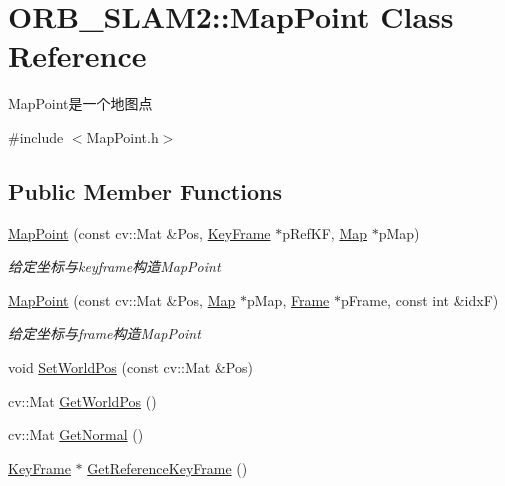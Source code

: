 \hypertarget{class_o_r_b___s_l_a_m2_1_1_map_point}{}\section{O\+R\+B\+\_\+\+S\+L\+A\+M2\+:\+:Map\+Point Class Reference}
\label{class_o_r_b___s_l_a_m2_1_1_map_point}


Map\+Point是一个地图点  




{\ttfamily \#include $<$Map\+Point.\+h$>$}

\subsection*{Public Member Functions}
\begin{DoxyCompactItemize}
\item 
\mbox{\hyperlink{class_o_r_b___s_l_a_m2_1_1_map_point_ae8b6d24a7f79cfd260502859cb5b6901}{Map\+Point}} (const cv\+::\+Mat \&Pos, \mbox{\hyperlink{class_o_r_b___s_l_a_m2_1_1_key_frame}{Key\+Frame}} $\ast$p\+Ref\+KF, \mbox{\hyperlink{class_o_r_b___s_l_a_m2_1_1_map}{Map}} $\ast$p\+Map)
\begin{DoxyCompactList}\small\item\em 给定坐标与keyframe构造\+Map\+Point \end{DoxyCompactList}\item 
\mbox{\hyperlink{class_o_r_b___s_l_a_m2_1_1_map_point_abbb2b679ea956845f315a69773618fa7}{Map\+Point}} (const cv\+::\+Mat \&Pos, \mbox{\hyperlink{class_o_r_b___s_l_a_m2_1_1_map}{Map}} $\ast$p\+Map, \mbox{\hyperlink{class_o_r_b___s_l_a_m2_1_1_frame}{Frame}} $\ast$p\+Frame, const int \&idxF)
\begin{DoxyCompactList}\small\item\em 给定坐标与frame构造\+Map\+Point \end{DoxyCompactList}\item 
void \mbox{\hyperlink{class_o_r_b___s_l_a_m2_1_1_map_point_ad65e6322e9d06314db235ff4d072509f}{Set\+World\+Pos}} (const cv\+::\+Mat \&Pos)
\item 
cv\+::\+Mat \mbox{\hyperlink{class_o_r_b___s_l_a_m2_1_1_map_point_a0e59b21447d5d889b39ad2fcc1b1db49}{Get\+World\+Pos}} ()
\item 
cv\+::\+Mat \mbox{\hyperlink{class_o_r_b___s_l_a_m2_1_1_map_point_af0198d242a96476faa52da0ede3c8f10}{Get\+Normal}} ()
\item 
\mbox{\hyperlink{class_o_r_b___s_l_a_m2_1_1_key_frame}{Key\+Frame}} $\ast$ \mbox{\hyperlink{class_o_r_b___s_l_a_m2_1_1_map_point_a98f595f0421fd95e406d1de6f48e05f3}{Get\+Reference\+Key\+Frame}} ()

\end{DoxyCompactItemize}
